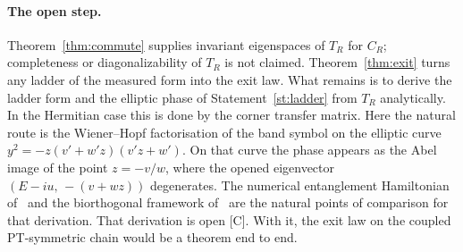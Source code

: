 \documentclass[11pt]{article}
\theoremstyle{definition}
\newcommand{\grade}[1]{\textsf{\small[#1]}}
\begin{document}
\paragraph{The open step.} Theorem~\ref{thm:commute} supplies invariant eigenspaces of $T_R$ for $C_R$; completeness or diagonalizability of $T_R$ is not claimed. Theorem~\ref{thm:exit} turns any ladder of the measured form into the exit law. What remains is to derive the ladder form and the elliptic phase of Statement~\ref{st:ladder} from $T_R$ analytically. In the Hermitian case this is done by the corner transfer matrix. Here the natural route is the Wiener--Hopf factorisation of the band symbol on the elliptic curve $y^2=-z(v'+w'z)(v'z+w')$. On that curve the phase appears as the Abel image of the point $z=-v/w$, where the opened eigenvector $(E-iu,\,-(v+wz))$ degenerates. The numerical entanglement Hamiltonian of~\cite{rottoli24} and the biorthogonal framework of~\cite{chang20,herviou19} are the natural points of comparison for that derivation. That derivation is open \grade{C}. With it, the exit law on the coupled PT-symmetric chain would be a theorem end to end.
\end{document}
